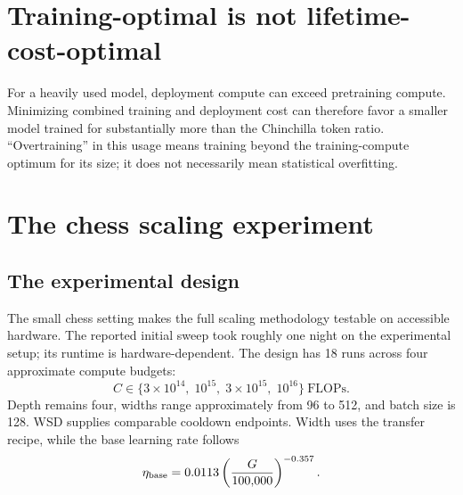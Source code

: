 \section{Training-optimal is not lifetime-cost-optimal}
For a heavily used model, deployment compute can exceed pretraining compute. Minimizing combined training and deployment cost can therefore favor a smaller model trained for substantially more than the Chinchilla token ratio. ``Overtraining'' in this usage means training beyond the training-compute optimum for its size; it does not necessarily mean statistical overfitting.


\section{The chess scaling experiment}
\subsection{The experimental design}
The small chess setting makes the full scaling methodology testable on accessible hardware. The reported initial sweep took roughly one night on the experimental setup; its runtime is hardware-dependent. The design has 18 runs across four approximate compute budgets:
\[
C\in\{3\times10^{14},\;10^{15},\;3\times10^{15},\;10^{16}\}\ \text{FLOPs}.
\]
Depth remains four, widths range approximately from 96 to 512, and batch size is 128. WSD supplies comparable cooldown endpoints. Width uses the transfer recipe, while the base learning rate follows
\begin{equation}
\eta_{\rm base}=0.0113\left(\frac{G}{100{,}000}\right)^{-0.357}.
\label{eq:scaling-recipe}
\end{equation}


